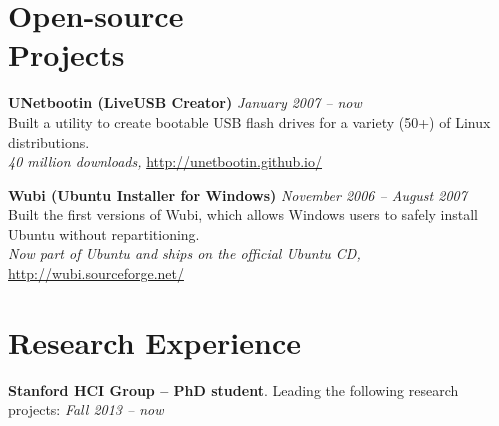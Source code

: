 \documentclass[margin,line]{resume}
\begin{document}
\begin{resume}

\vspace{-3mm}

\section{\mysidestyle Open-source\\Projects}

\textbf{UNetbootin (LiveUSB Creator)} \hfill \textsl{January 2007 -- now}\\
Built a utility to create bootable USB flash drives for a variety (50+) of Linux distributions.\\ %
\emph{40 million downloads,} \url{http://unetbootin.github.io/}

\textbf{Wubi (Ubuntu Installer for Windows)} \hfill \textsl{November 2006 -- August 2007}\\
Built the first versions of Wubi, which allows Windows users to safely install Ubuntu without repartitioning. \\ %
\emph{Now part of Ubuntu and ships on the official Ubuntu CD,} \url{http://wubi.sourceforge.net/}

\section{\mysidestyle Research Experience}

\textbf{Stanford HCI Group -- PhD student}. Leading the following research projects: \hfill \textsl{Fall 2013 -- now}

\vspace{-2mm}


\end{resume}
\end{document}
